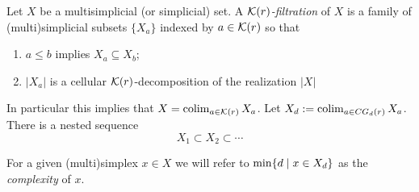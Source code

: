 \begin{definition}
	Let $X$ be a multisimplicial (or simplicial) set.
	A \textit{$\mathcal{K}(r)$-filtration}
	of $X$ is a 
family of (multi)simplicial subsets $\{X_a\}$ indexed by
$a \in \mathcal{K}(r)$ so that
\begin{enumerate}
\item $a \leq b$ implies $X_a \subseteq X_b$;
\item $|X_a|$ is a cellular  $\mathcal{K}(r)$-decomposition of the realization $|X|$
\end{enumerate}
In particular this implies that $X=\operatorname*{colim}_{a \in \mathcal{K}(r)}X_a$.
Let $X_d:=\operatorname*{colim}_{a \in CG_d(r)} X_a$.
There is a nested sequence
\[
	X_1 \subset X_2 \subset \dotsb
	\]

For a given (multi)simplex $x \in X$	we will refer to $\min\{d \mid x \in X_d\}$ as the \textit{complexity} of $x$.
\end{definition}